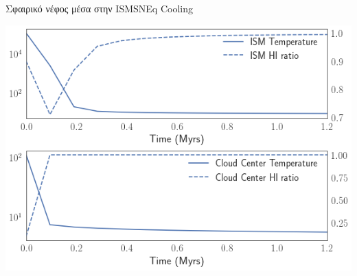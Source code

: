 \documentclass{beamer}
\begin{document}
\begin{frame}{Σφαιρικό νέφος μέσα στην ISM}{SNEq Cooling}
	\begin{center}
		\includegraphics[width=0.9\linewidth]{../Document/DataImages/SNCoolingTMPcenterISM}
	\end{center}
\end{frame}
\end{document}
